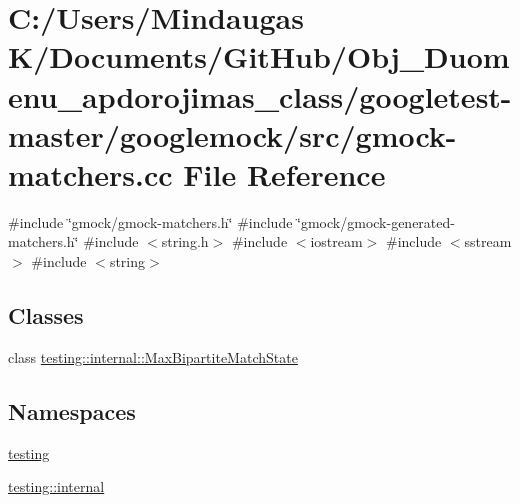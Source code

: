 \hypertarget{googletest-master_2googlemock_2src_2gmock-matchers_8cc}{}\section{C\+:/\+Users/\+Mindaugas K/\+Documents/\+Git\+Hub/\+Obj\+\_\+\+Duomenu\+\_\+apdorojimas\+\_\+class/googletest-\/master/googlemock/src/gmock-\/matchers.cc File Reference}
\label{googletest-master_2googlemock_2src_2gmock-matchers_8cc}
{\ttfamily \#include \char`\"{}gmock/gmock-\/matchers.\+h\char`\"{}}\newline
{\ttfamily \#include \char`\"{}gmock/gmock-\/generated-\/matchers.\+h\char`\"{}}\newline
{\ttfamily \#include $<$string.\+h$>$}\newline
{\ttfamily \#include $<$iostream$>$}\newline
{\ttfamily \#include $<$sstream$>$}\newline
{\ttfamily \#include $<$string$>$}\newline
\subsection*{Classes}
\begin{DoxyCompactItemize}
\item 
class \mbox{\hyperlink{classtesting_1_1internal_1_1_max_bipartite_match_state}{testing\+::internal\+::\+Max\+Bipartite\+Match\+State}}
\end{DoxyCompactItemize}
\subsection*{Namespaces}
\begin{DoxyCompactItemize}
\item 
 \mbox{\hyperlink{namespacetesting}{testing}}
\item 
 \mbox{\hyperlink{namespacetesting_1_1internal}{testing\+::internal}}
\end{DoxyCompactItemize}
